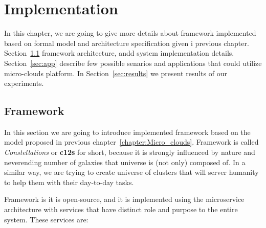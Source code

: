 \chapter{Implementation}\label{chapter:Implementation}
%
In this chapter, we are going to give more details about framework implemented based on formal model and architecture specification given i previous chapter.
Section~\ref{sec:framework} framework architecture, andd system implementation details. Section~\ref{sec:app} describe few possible senarios and applications that could utilize micro-clouds platform. In Section~\ref{sec:results} we present results of our experiments.
%
%
\section{Framework}\label{sec:framework}
%
In this section we are going to introduce implemented framework based on the model proposed in previous chapter~\ref{chapter:Micro_clouds}. Framework is called \textit{Constellations} or \textbf{c12s} for short, because it is strongly influenced by nature and neverending number of galaxies that universe is (not only) composed of. In a similar way, we are trying to create universe of clusters that will server humanity to help them with their day-to-day tasks.

Framework is it is open-source, and it is implemented using the microservice architecture with services that have distinct role and purpose to the entire system. These services are:

